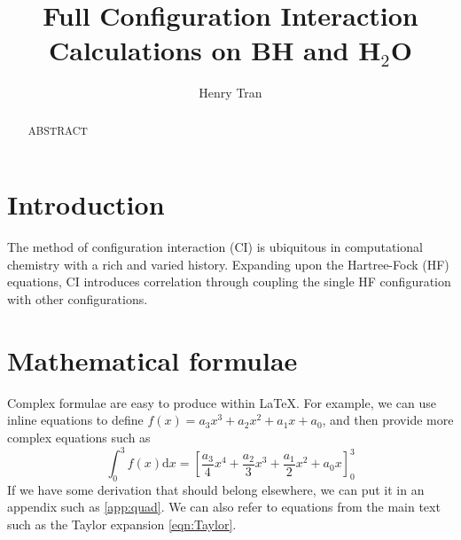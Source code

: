\documentclass[final,3p,times,twocolumn]{elsarticle}
\begin{document}
\begin{frontmatter}



\title{Full Configuration Interaction Calculations on BH and H$_2$O}


\author{Henry Tran}

\address{Department of Chemistry, Lensfield Road, Cambridge, UK,
CB2 1EW}

\begin{abstract}
ABSTRACT
\end{abstract}

\end{frontmatter}


\section{Introduction}
The method of configuration interaction (CI) is ubiquitous in computational chemistry with a rich and varied history. Expanding upon the Hartree-Fock (HF) equations,\cite{hartree,fock} CI introduces correlation through coupling the single HF configuration with other configurations.

\section{Mathematical formulae}
\label{sect:Formulae}
Complex formulae are easy to produce within \LaTeX{}. For example, we
can use inline equations to define $f(x) = a_3x^3 + a_2x^2 + a_1x +
a_0$, and then provide more complex equations such as
\begin{equation}
\int_0^3 f(x) \mathrm{d}x = \left[\frac{a_3}{4}x^4 + \frac{a_2}{3}x^3
  + \frac{a_1}{2}x^2 + a_0x\right]_0^3
\label{eqn:Taylor}
\end{equation}
If we have some derivation that should belong elsewhere, we can put it
in an appendix such as \ref{app:quad}. We can also refer to equations
from the main text such as the Taylor expansion \ref{eqn:Taylor}.
\end{document}
